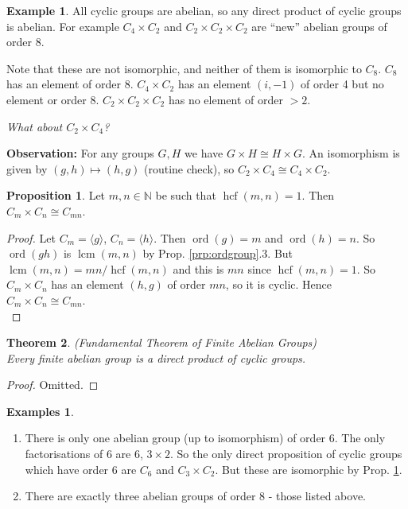 \documentclass{article}
\newtheorem{theorem}{Theorem}
\theoremstyle{definition}
\newtheorem{proposition}[theorem]{Proposition}
\newtheorem*{exmp}{Example}
\newtheorem*{exmps}{Examples}
\newcommand{\gene}[1]{\langle #1 \rangle}
\newcommand{\naturals}{\mathbb{N}}
\newcommand{\ism}{\cong}
\DeclareMathOperator{\lcm}{lcm}
\DeclareMathOperator{\hcf}{hcf}
\DeclareMathOperator{\ord}{\text{ord}}
\begin{document}
\begin{exmp}
  All cyclic groups are abelian, so any direct product of cyclic groups is abelian. For example $C_4 \times C_2$ and $C_2 \times C_2 \times C_2$ are ``new'' abelian groups of order 8.

  Note that these are not isomorphic, and neither of them is isomorphic to $C_8$. $C_8$ has an element of order 8. $C_4 \times C_2$ has an element $(i,-1)$ of order 4 but no element or order 8.  $C_2 \times C_2 \times C_2$ has no element of order $> 2$.

\end{exmp}
  \emph{What about $C_2 \times C_4$?}

  \textbf{Observation:} For any groups $G,H$ we have $G \times H \ism H \times G$. An isomorphism is given by $(g,h)\mapsto (h,g)$ (routine check), so $C_2 \times C_4 \ism C_4 \times C_2$.\\

  \begin{proposition}
  \label{prp:hcfcyclic}
    Let $m,n \in \naturals$ be such that $\hcf(m,n)=1$. Then $C_m \times C_n \ism C_{mn}$.
  \end{proposition}

  \begin{proof}
    Let $C_m = \gene{g}$, $C_n=\gene{h}$. Then $\ord(g)=m$ and $\ord(h)=n$. So $\ord(gh)$ is $\lcm(m,n)$ by Prop. \ref{prp:ordgroup}.3. But $\lcm(m,n)=mn/\hcf(m,n)$ and this is $mn$ since $\hcf(m,n)=1$. So $C_m \times C_n$ has an element $(h,g)$ of order $mn$, so it is cyclic. Hence $C_m \times C_n \ism C_{mn}$.\\
  \end{proof} 

  \begin{theorem}(Fundamental Theorem of Finite Abelian Groups)\hfill\\
    Every finite abelian group is a direct product of cyclic groups.
    \label{thm:funda}
  \end{theorem}

  \begin{proof}
    Omitted.
  \end{proof}

  \begin{exmps}\hfill
    \begin{enumerate}
      \item There is only one abelian group (up to isomorphism) of order 6. The only factorisations of 6 are 6, $3 \times 2$. So the only direct proposition of cyclic groups which have order 6 are $C_6$ and $C_3 \times C_2$. But these are isomorphic by Prop. \ref{prp:hcfcyclic}.
      \item There are exactly three abelian groups of order 8 - those listed above.
    \end{enumerate}
  \end{exmps}
\end{document}
